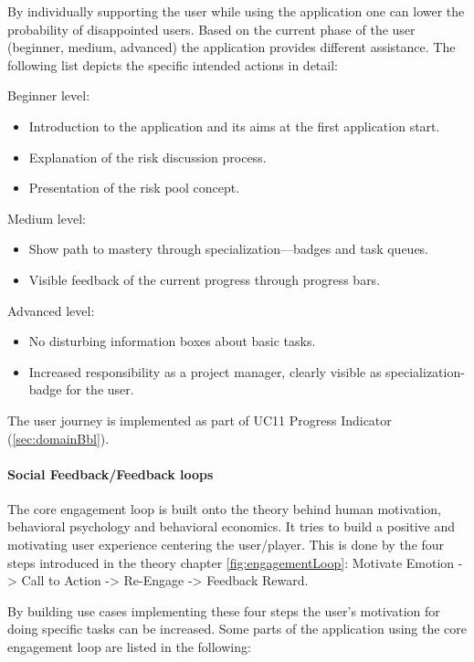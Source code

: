 By individually supporting the user while using the application one can lower the probability of disappointed users. Based on the current phase of the user (beginner, medium, advanced) the application provides different assistance. The following list depicts the specific intended actions in detail:

\noindent
Beginner level:
\begin{itemize}
	\item Introduction to the application and its aims at the first application start.
	\item Explanation of the risk discussion process.
	\item Presentation of the risk pool concept.
\end{itemize}

\noindent
Medium level:
\begin{itemize}
	\item Show path to mastery through specialization—badges and task queues.
	\item Visible feedback of the current progress through progress bars.
\end{itemize}

\noindent
Advanced level:
\begin{itemize}
	\item No disturbing information boxes about basic tasks.
	\item Increased responsibility as a project manager, clearly visible as specialization-badge for the user.
\end{itemize}

\noindent
The user journey is implemented as part of \ac{UC}11 Progress Indicator (\ref{sec:domainBbl}).

\paragraph*{Social Feedback/Feedback loops}

The core engagement loop is built onto the theory behind human motivation, behavioral psychology and behavioral economics. It tries to build a positive and motivating user experience centering the user/player. This is done by the four steps introduced in the theory chapter \ref{fig:engagementLoop}: Motivate Emotion -> Call to Action -> Re-Engage -> Feedback Reward. 

By building use cases implementing these four steps the user's motivation for doing specific tasks can be increased. Some parts of the application using the core engagement loop are listed in the following:

